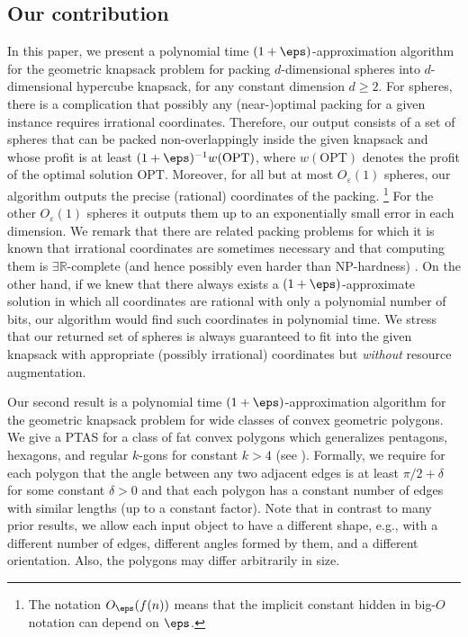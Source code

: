 \documentclass[10pt,a4paper]{article}
\theoremstyle{plain}
\theoremstyle{plain}
\theoremstyle{plain}
\theoremstyle{definition}
\newcommand{\ag}[1]{#1}
\newcommand{\agtwo}[1]{#1}
\begin{document}
\subsection{Our contribution}

In this paper, we present a polynomial time $(1+\eps)$-approximation algorithm for the geometric knapsack problem for packing  
$d$-dimensional spheres into $d$-dimensional hypercube knapsack, for any constant dimension $d \ge 2$. For spheres,
there is a complication that possibly any (near-)optimal
\agtwo{packing} for a given instance requires irrational coordinates. Therefore,
our output consists of a set of spheres that can be packed non-overlappingly
inside the given knapsack and whose profit is at least \ag{$(1+\eps)^{-1}w\mathrm{(OPT)}$,
where $w\mathrm{(OPT)}$ denotes the profit of the optimal solution $\mathrm{OPT}$}.
Moreover, for all but at most $O_{\varepsilon}(1)$ spheres, our algorithm
outputs the precise (rational) coordinates of the packing. \footnote{The notation $O_{\eps}(f(n))$ means that the implicit constant hidden in big-$O$ notation can depend on $\eps$.}
For the other $O_{\varepsilon}(1)$
spheres it outputs them up to an exponentially small error in each
dimension. We remark that there are related packing problems for which
it is known that irrational coordinates are sometimes necessary and
that computing them is $\exists\mathbb{R}$-complete (and hence possibly
even harder than \textsf{NP}-hardness) \cite{abrahamsen2020framework}.
On the other hand, if we knew that there always exists a $(1+\eps)$-approximate
solution in which all coordinates are rational with only a polynomial
number of bits, our algorithm would find such coordinates in polynomial
time. We stress that our returned set of spheres is always guaranteed
to fit into the given knapsack with appropriate (possibly irrational)
coordinates but \emph{without} resource augmentation.

Our second result is a polynomial time $(1+\eps)$-approximation
\agtwo{algorithm} for the geometric knapsack problem for wide classes of
convex geometric polygons. We give a \textsf{PTAS} for a class of
fat convex polygons which generalizes pentagons, hexagons, and regular
$k$-gons for constant $k>4$ (see ). Formally, we require
for each polygon that the angle between any two adjacent edges is
at least $\pi/2+\delta$ for some constant $\delta>0$ and that each
polygon has a constant number of edges with similar lengths (up to
a constant factor). Note that in contrast to many prior results, we
allow each input object to have a different shape, e.g., with a different
number of edges, different angles formed by them, and a different
orientation. Also, the polygons may differ arbitrarily in size.
\end{document}
